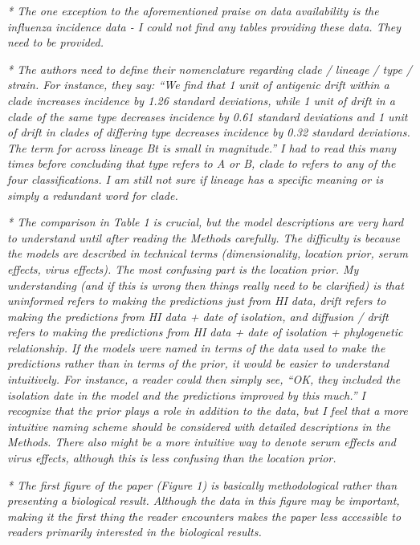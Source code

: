 \documentclass[11pt,oneside,letterpaper]{article}
\begin{document}
\textsl{* The one exception to the aforementioned praise on data availability is the influenza incidence data - I could not find any tables providing these data. They need to be provided.}

\textsl{* The authors need to define their nomenclature regarding clade / lineage / type / strain. For instance, they say: ``We find that 1 unit of antigenic drift within a clade increases incidence by 1.26 standard deviations, while 1 unit of drift in a clade of the same type decreases incidence by 0.61 standard deviations and 1 unit of drift in clades of differing type decreases incidence by 0.32 standard deviations. The term for across lineage Bt is small in magnitude.'' I had to read this many times before concluding that type refers to A or B, clade to refers to any of the four classifications. I am still not sure if lineage has a specific meaning or is simply a redundant word for clade.}

\textsl{* The comparison in Table 1 is crucial, but the model descriptions are very hard to understand until after reading the Methods carefully. The difficulty is because the models are described in technical terms (dimensionality, location prior, serum effects, virus effects). The most confusing part is the location prior. My understanding (and if this is wrong then things really need to be clarified) is that uninformed refers to making the predictions just from HI data, drift refers to making the predictions from HI data + date of isolation, and diffusion / drift refers to making the predictions from HI data + date of isolation + phylogenetic relationship. If the models were named in terms of the data used to make the predictions rather than in terms of the prior, it would be easier to understand intuitively. For instance, a reader could then simply see, ``OK, they included the isolation date in the model and the predictions improved by this much.'' I recognize that the prior plays a role in addition to the data, but I feel that a more intuitive naming scheme should be considered with detailed descriptions in the Methods. There also might be a more intuitive way to denote serum effects and virus effects, although this is less confusing than the location prior.}

\textsl{* The first figure of the paper (Figure 1) is basically methodological rather than presenting a biological result. Although the data in this figure may be important, making it the first thing the reader encounters makes the paper less accessible to readers primarily interested in the biological results.}
\end{document}

